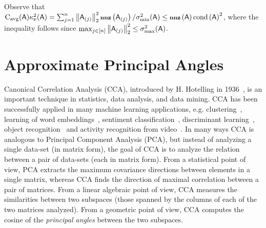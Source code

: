 %
Observe that $\mathrm{C}_{\mathrm{avg}}({\mathsf{A} }) \kappa^2_{\textrm{\tiny F}}({\mathsf{A} }) = \sum_{j=1}^{n}\left\|{\mathsf{A} }_{(j)}\right\|_2^2 \operatorname{\textbf{\footnotesize nnz}}\left({\mathsf{A} }_{(j)}\right) / \sigma^2_{\min}({\mathsf{A} }) \leq \operatorname{\textbf{\footnotesize nnz}}\left({\mathsf{A} }\right) \operatorname{\mathrm{cond}}\left({\mathsf{A} }\right)^2$, where the inequality follows since $\max_{j\in{[n]}} \left\|{\mathsf{A} }_{(j)}\right\|_2^2 \leq \sigma_{\max}^2({\mathsf{A} })$.
%
%
%
%
%
%
\section{Approximate Principal Angles}\label{sec:approxCCA}
%
Canonical Correlation Analysis (CCA), introduced by H. Hotelling in 1936~\cite{Hot36}, is an important technique in statistics, data analysis, and data mining. CCA  has been successfully applied in many machine learning applications, e.g. clustering~\cite{CKLS09}, learning of word embeddings~\cite{DFU11}, sentiment classification~\cite{DRFU12}, discriminant learning~\cite{SFGT12}, object recognition~\cite{KKC07} and activity recognition from video~\cite{LAMCS11}.
In many ways CCA is analogous to Principal Component Analysis (PCA), but instead of analyzing a single data-set (in matrix form), the goal of CCA is to analyze the relation between a pair of data-sets (each in matrix form). From a statistical point of view, PCA extracts the maximum covariance directions between elements in a single matrix, whereas CCA finds the direction of maximal correlation between a pair of matrices. From a linear algebraic point of view, CCA measures the similarities between two subspaces (those spanned by the columns of each of the two matrices analyzed). From a geometric point of view, CCA computes the cosine of the \emph{principal angles} between the two subspaces.
%

